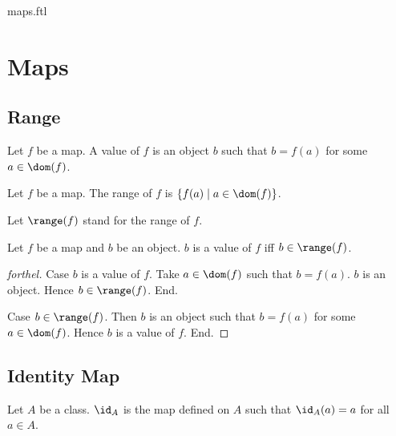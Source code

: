 \documentclass{naproche-library}
\begin{document}
\begin{smodule}{maps.ftl}


  \section*{Maps}

  \subsection*{Range}

  \begin{definition}[forthel,id=FOUNDATIONS_06_4284980337311744]
    Let $f$ be a map.
    A value of $f$ is an object $b$ such that $b = f(a)$ for some $a \in \dom(f)$.
  \end{definition}

  \begin{definition}[forthel,id=FOUNDATIONS_06_1938831225913344]
    Let $f$ be a map.
    The range of $f$ is $\{ f(a) \mid a \in \dom(f) \}$.

    Let $\range(f)$ stand for the range of $f$.
  \end{definition}

  \begin{proposition}[forthel,id=FOUNDATIONS_06_6386349418479616]
    Let $f$ be a map and $b$ be an object.
    $b$ is a value of $f$ iff $b \in \range(f)$.
  \end{proposition}
  \begin{proof}[forthel]
    Case $b$ is a value of $f$.
      Take $a \in \dom(f)$ such that $b = f(a)$.
      $b$ is an object.
      Hence $b \in \range(f)$.
    End.

    Case $b \in \range(f)$.
      Then $b$ is an object such that $b = f(a)$ for some $a \in \dom(f)$.
      Hence $b$ is a value of $f$.
    End.
  \end{proof}


  \subsection*{Identity Map}

  \begin{definition}[forthel,id=FOUNDATIONS_06_1920902360989696]
    Let $A$ be a class.
    $\id_{A}$ is the map defined on $A$ such that $\id_{A}(a) = a$ for all $a \in A$.


\end{definition}
\end{smodule}
\end{document}
